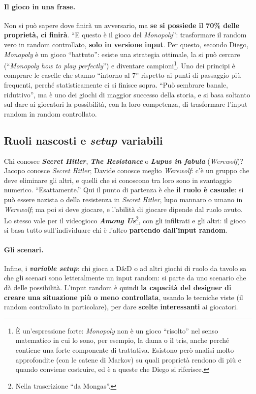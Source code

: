 \paragraph{Il gioco in una frase.} Non si può sapere dove finirà un avversario, ma \textbf{se
si possiede il 70\% delle proprietà, ci finirà}. ``E questo è il gioco del
\emph{Monopoly}'': trasformare il random vero in random controllato, \textbf{solo in versione
input}. Per questo, secondo Diego, \emph{Monopoly} è un gioco ``battuto'': esiste una
strategia ottimale, la si può cercare (``\emph{Monopoly how to play perfectly}'') e diventare
campioni\footnote{È un'espressione forte: \emph{Monopoly} non è un gioco ``risolto'' nel
senso matematico in cui lo sono, per esempio, la dama o il tris, anche perché contiene una
forte componente di trattativa. Esistono però analisi molto approfondite (con le catene di
Markov) su quali proprietà rendono di più e quando conviene costruire, ed è a queste che
Diego si riferisce.}. Uno dei principi è comprare le caselle che stanno ``intorno al 7''
rispetto ai punti di passaggio più frequenti, perché statisticamente ci si finisce sopra.
``Può sembrare banale, riduttivo'', ma è uno dei giochi di maggior successo della storia, e
si basa soltanto sul dare ai giocatori la possibilità, con la loro competenza, di
trasformare l'input random in random controllato.

\subsection{Ruoli nascosti e \emph{setup} variabili}

Chi conosce \textbf{\emph{Secret Hitler}}, \textbf{\emph{The Resistance}} o \textbf{\emph{Lupus
in fabula}} (\emph{Werewolf})? Jacopo conosce \emph{Secret Hitler}; Davide conosce meglio
\emph{Werewolf}: c'è un gruppo che deve eliminare gli altri, e quelli che si conoscono tra
loro sono in svantaggio numerico. ``Esattamente.'' Qui il punto di partenza è che
\textbf{il ruolo è casuale}: si può essere nazista o della resistenza in \emph{Secret
Hitler}, lupo mannaro o umano in \emph{Werewolf}; ma poi si deve giocare, e l'abilità di
giocare dipende dal ruolo avuto. Lo stesso vale per il videogioco \textbf{\emph{Among
Us}}\footnote{Nella trascrizione ``da Mongas''.}, con gli infiltrati e gli altri: il gioco si
basa tutto sull'individuare chi è l'altro \textbf{partendo dall'input random}.

\paragraph{Gli scenari.} Infine, i \textbf{\emph{variable setup}}: chi gioca a D\&D o ad altri
giochi di ruolo da tavolo sa che gli scenari sono letteralmente un input random: si parte da
uno scenario che dà delle possibilità. L'input random è quindi \textbf{la capacità del
designer di creare una situazione più o meno controllata}, usando le tecniche viste (il
random controllato in particolare), per dare \textbf{scelte interessanti} ai giocatori.

